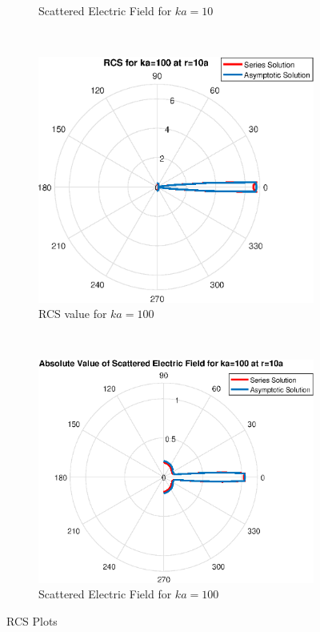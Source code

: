 \documentclass[11pt]{amsart}
\begin{document}
\begin{figure}[!h]
\begin{subfigure}[b]{0.5\textwidth}
        \caption{Scattered Electric Field for $ka=10$}
        \label{fig:tiger}
    \end{subfigure}
  \\
  \begin{subfigure}[b]{0.5\textwidth}
        \includegraphics[width=\textwidth]{AsymRCSka100}
         \caption{RCS value for $ka=100$}
        \label{fig:gull}
    \end{subfigure}
    ~ %
    \begin{subfigure}[b]{0.5\textwidth}
        \includegraphics[width=\textwidth]{AsymEka100}
         \caption{Scattered Electric Field for $ka=100$}
        \label{fig:tiger}
    \end{subfigure}
    \caption{RCS Plots}\label{fig:RCS}
\end{figure}
\end{document}
